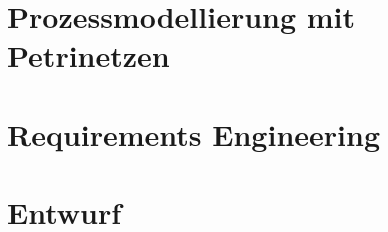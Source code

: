 \cleardoublepage
\part{Prozessmodellierung mit Petrinetzen}
\label{sec:Lektion-3}
\sttpDeckblattRueckseite{\partname~\thepart}%

\cleardoublepage
\chaptertoc %

\begin{refsection}
	
	
	\cleardoublepage %
	\printbibliography[heading=subbibliography]
\end{refsection}

\cleardoublepage
\part{Requirements Engineering}
\label{sec:Lektion-4}
\sttpDeckblattRueckseite{\partname~\thepart}%

\cleardoublepage
\chaptertoc %

\begin{refsection}
	
	
	\cleardoublepage %
	\printbibliography[heading=subbibliography]
\end{refsection}

\cleardoublepage
\part{Entwurf}
\label{sec:Lektion-5}
\sttpDeckblattRueckseite{\partname~\thepart}%

